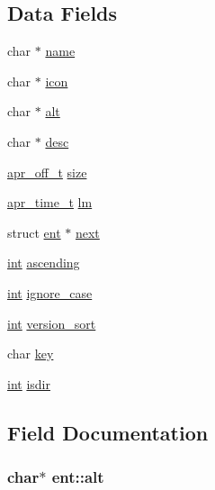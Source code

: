 \subsection*{Data Fields}
\begin{DoxyCompactItemize}
\item 
char $\ast$ \hyperlink{structent_ae12112a008e508fd1f5bb0749ba1915a}{name}
\item 
char $\ast$ \hyperlink{structent_aada6445e9181c2df1add370aab20e823}{icon}
\item 
char $\ast$ \hyperlink{structent_a964af0c87ff54b2e3f67d14022b6f217}{alt}
\item 
char $\ast$ \hyperlink{structent_aa2ced4ffc1cd400ed5225020c51dea44}{desc}
\item 
\hyperlink{group__apr__platform_ga6938af9075cec15c88299109381aa984}{apr\+\_\+off\+\_\+t} \hyperlink{structent_ab5d7e3a8202e048abae69ef43e8ca4b6}{size}
\item 
\hyperlink{group__apr__time_gadb4bde16055748190eae190c55aa02bb}{apr\+\_\+time\+\_\+t} \hyperlink{structent_ae060d2fdf08cf16acd60205868bff888}{lm}
\item 
struct \hyperlink{structent}{ent} $\ast$ \hyperlink{structent_a043cc4f35d88b90312ecfc23aa411391}{next}
\item 
\hyperlink{pcre_8txt_a42dfa4ff673c82d8efe7144098fbc198}{int} \hyperlink{structent_ad0d9cdd48ab6f86b4ad889b19d6ab1cc}{ascending}
\item 
\hyperlink{pcre_8txt_a42dfa4ff673c82d8efe7144098fbc198}{int} \hyperlink{structent_a2062049b88b4a1f350218f874be52d6c}{ignore\+\_\+case}
\item 
\hyperlink{pcre_8txt_a42dfa4ff673c82d8efe7144098fbc198}{int} \hyperlink{structent_a158daf0c8c1b1e94ad8d497be64d7e9f}{version\+\_\+sort}
\item 
char \hyperlink{structent_adfcf849f8a071ddb32e32261816e6fe0}{key}
\item 
\hyperlink{pcre_8txt_a42dfa4ff673c82d8efe7144098fbc198}{int} \hyperlink{structent_a1b9c5fccb909ba0a11059f9c0fe16f5c}{isdir}
\end{DoxyCompactItemize}


\subsection{Field Documentation}
\subsubsection[{\texorpdfstring{alt}{alt}}]{\setlength{\rightskip}{0pt plus 5cm}char$\ast$ ent\+::alt}\hypertarget{structent_a964af0c87ff54b2e3f67d14022b6f217}{}\label{structent_a964af0c87ff54b2e3f67d14022b6f217}

